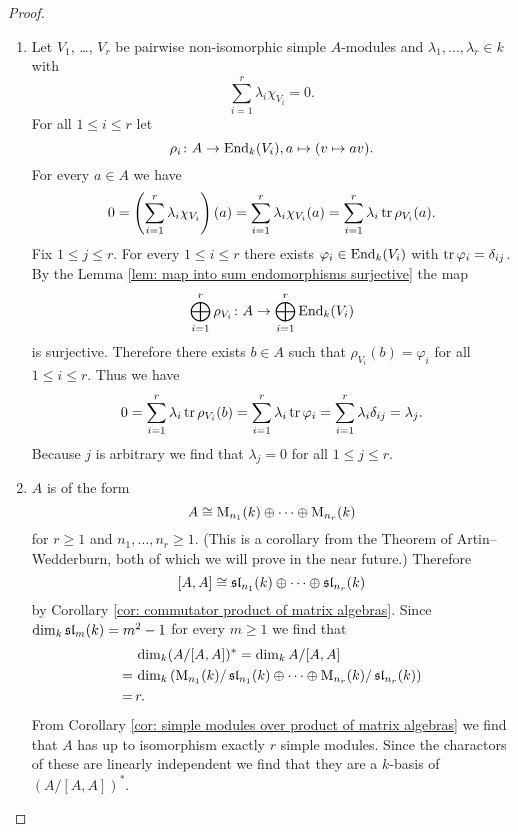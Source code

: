 \begin{proof}
  \begin{enumerate}[label=\emph{\alph*)},leftmargin=*]
    \item
      Let $V_1$, \dots, $V_r$ be pairwise non-isomorphic simple $A$-modules and $\lambda_1, \dotsc, \lambda_r \in k$ with
      \[
          \sum_{i=1}^r \lambda_i \chi_{V_i}
        = 0.
      \]
      For all $1 \leq i \leq r$ let
      \[
                \rho_i
        \colon  A
        \to     \operatorname{End}_k(V_i),
                a
        \mapsto (v \mapsto av).
      \]
      For every $a \in A$ we have
      \[
          0
        = \left( \sum_{i=1}^r \lambda_i \chi_{V_i} \right)(a)
        = \sum_{i=1}^r \lambda_i \chi_{V_i}(a)
        = \sum_{i=1}^r \lambda_i \operatorname{tr} \rho_{V_i}(a).
      \]
      Fix $1 \leq j \leq r$.
      For every $1 \leq i \leq r$ there exists $\varphi_i \in \operatorname{End}_k(V_i)$ with $\operatorname{tr} \varphi_i = \delta_{ij}$.
      By the Lemma \ref{lem: map into sum endomorphisms surjective} the map
      \[
                \bigoplus_{i=1}^r \rho_{V_i}
        \colon  A
        \to     \bigoplus_{i=1}^r \operatorname{End}_k(V_i)
      \]
      is surjective.
      Therefore there exists $b \in A$ such that $\rho_{V_i}(b) = \varphi_i$ for all $1 \leq i \leq r$.
      Thus we have
      \[
          0
        = \sum_{i=1}^r \lambda_i \operatorname{tr} \rho_{V_i}(b)
        = \sum_{i=1}^r \lambda_i \operatorname{tr} \varphi_i
        = \sum_{i=1}^r \lambda_i \delta_{ij}
        = \lambda_j.
      \]
      Because $j$ is arbitrary we find that $\lambda_j = 0$ for all $1 \leq j \leq r$.
    \item
      $A$ is of the form 
      \[
        A \cong \operatorname{M}_{n_1}(k) \oplus \dotsb \oplus \operatorname{M}_{n_r}(k)
      \]
      for $r \geq 1$ and $n_1, \dotsc, n_r \geq 1$.
      (This is a corollary from the Theorem of Artin--Wedderburn, both of which we will prove in the near future.) Therefore
      \[
        [A,A] \cong \operatorname{\mathfrak{sl}}_{n_1}(k) \oplus \dotsb \oplus \operatorname{\mathfrak{sl}}_{n_r}(k)
      \]
      by Corollary \ref{cor: commutator product of matrix algebras}.
      Since $\dim_k \operatorname{\mathfrak{sl}}_m(k) = m^2 - 1$ for every $m \geq 1$ we find that
      \begin{align*}
         &\,  \dim_k (A/[A,A])^*
        =     \dim_k A/[A,A] \\
        =&\,  \dim_k\left(
                              \operatorname{M}_{n_1}(k) / \operatorname{\mathfrak{sl}}_{n_1}(k)
                      \oplus  \dotsb
                      \oplus  \operatorname{M}_{n_r}(k) / \operatorname{\mathfrak{sl}}_{n_r}(k)
                    \right) \\
        =&\,  r.
      \end{align*}
      From Corollary \ref{cor: simple modules over product of matrix algebras} we find that $A$ has up to isomorphism exactly $r$ simple modules.
      Since the charactors of these are linearly independent we find that they are a $k$-basis of $(A/[A,A])^*$.
    \qedhere
  \end{enumerate}
\end{proof}


